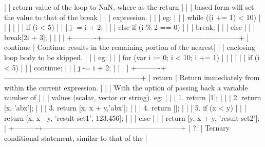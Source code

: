 |          | return value of the loop to NaN, where as the return    |
|          | based form will set the value to that of the break      |
|          | expression.                                             |
|          | eg:                                                     |
|          | while ((i += 1) < 10)                                   |
|          | {                                                       |
|          |   if (i < 5)                                            |
|          |     j -= i + 2;                                         |
|          |   else if (i \% 2 == 0)                                  |
|          |     break;                                              |
|          |   else                                                  |
|          |     break[2i + 3];                                      |
|          | }                                                       |
+----------+---------------------------------------------------------+
| continue | Continue results in the remaining portion of the nearest|
|          | enclosing loop body to be skipped.                      |
|          | eg:                                                     |
|          | for (var i := 0; i < 10; i += 1)                        |
|          | {                                                       |
|          |   if (i < 5)                                            |
|          |     continue;                                           |
|          |   j -= i + 2;                                           |
|          | }                                                       |
+----------+---------------------------------------------------------+
| return   | Return immediately from within the current expression.  |
|          | With the option of passing back a variable number of    |
|          | values (scalar, vector or string). eg:                  |
|          | 1. return [1];                                          |
|          | 2. return [x, 'abx'];                                   |
|          | 3. return [x, x + y,'abx'];                             |
|          | 4. return [];                                           |
|          | 5. if (x < y)                                           |
|          |     return [x, x - y, 'result-set1', 123.456];          |
|          |    else                                                 |
|          |     return [y, x + y, 'result-set2'];                   |
+----------+---------------------------------------------------------+
| ?:       | Ternary conditional statement, similar to that of the   |
